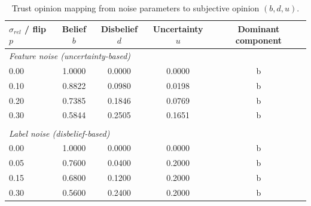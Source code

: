 \begin{table}[ht]
\centering
\caption{Trust opinion mapping from noise parameters to subjective opinion $(b, d, u)$.}
\label{tab:trust-mapping}
\begin{tabular}{lcccc}
\toprule
$\sigma_{rel}$ / flip $p$ & Belief $b$ & Disbelief $d$ & Uncertainty $u$ & Dominant component \\
\midrule
\multicolumn{5}{l}{\textit{Feature noise (uncertainty-based)}} \\
0.00 & 1.0000 & 0.0000 & 0.0000 & b \\
0.10 & 0.8822 & 0.0980 & 0.0198 & b \\
0.20 & 0.7385 & 0.1846 & 0.0769 & b \\
0.30 & 0.5844 & 0.2505 & 0.1651 & b \\
\midrule \\
\multicolumn{5}{l}{\textit{Label noise (disbelief-based)}} \\
0.00 & 1.0000 & 0.0000 & 0.0000 & b \\
0.05 & 0.7600 & 0.0400 & 0.2000 & b \\
0.15 & 0.6800 & 0.1200 & 0.2000 & b \\
0.30 & 0.5600 & 0.2400 & 0.2000 & b \\
\bottomrule
\end{tabular}
\end{table}